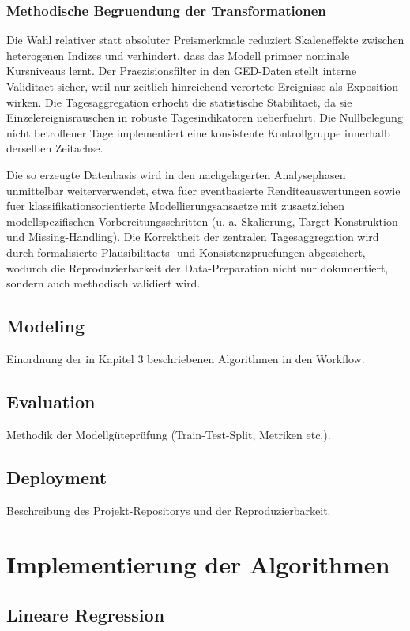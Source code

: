 \documentclass[12pt,a4paper]{article}
\begin{document}
\subsubsection{Methodische Begruendung der Transformationen}
Die Wahl relativer statt absoluter Preismerkmale reduziert Skaleneffekte zwischen
heterogenen Indizes und verhindert, dass das Modell primaer nominale Kursniveaus lernt.
Der Praezisionsfilter in den GED-Daten stellt interne Validitaet sicher, weil nur
zeitlich hinreichend verortete Ereignisse als Exposition wirken. Die Tagesaggregation
erhoeht die statistische Stabilitaet, da sie Einzelereignisrauschen in robuste
Tagesindikatoren ueberfuehrt. Die Nullbelegung nicht betroffener Tage implementiert eine
konsistente Kontrollgruppe innerhalb derselben Zeitachse.

Die so erzeugte Datenbasis wird in den nachgelagerten Analysephasen unmittelbar
weiterverwendet, etwa fuer eventbasierte Renditeauswertungen sowie fuer
klassifikationsorientierte Modellierungsansaetze mit zusaetzlichen
modellspezifischen Vorbereitungsschritten (u. a. Skalierung,
Target-Konstruktion und Missing-Handling). Die Korrektheit der zentralen
Tagesaggregation wird durch formalisierte Plausibilitaets- und
Konsistenzpruefungen abgesichert, wodurch die Reproduzierbarkeit der
Data-Preparation nicht nur dokumentiert, sondern auch methodisch validiert wird.

\subsection{Modeling}
Einordnung der in Kapitel 3 beschriebenen Algorithmen in den Workflow.

\subsection{Evaluation}
Methodik der Modellgüteprüfung (Train-Test-Split, Metriken etc.).

\subsection{Deployment}
Beschreibung des Projekt-Repositorys und der Reproduzierbarkeit.

\section{Implementierung der Algorithmen}
\subsection{Lineare Regression}
\end{document}
